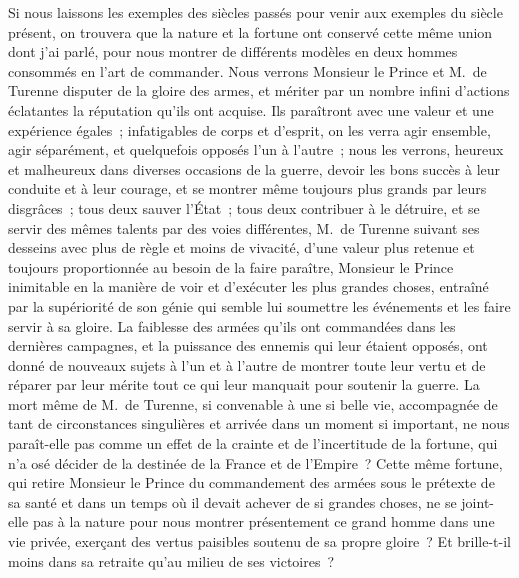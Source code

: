 \documentclass[french,twoside]{book} %
\begin{document}
Si nous laissons les exemples des siècles passés pour venir aux exemples du siècle présent, on trouvera que la nature et la fortune ont conservé cette même union dont j’ai parlé, pour nous montrer de différents modèles en deux hommes consommés en l’art de commander. Nous verrons Monsieur le Prince et M. de Turenne disputer de la gloire des armes, et mériter par un nombre infini d’actions éclatantes la réputation qu’ils ont acquise. Ils paraîtront avec une valeur et une expérience égales ; infatigables de corps et d’esprit, on les verra agir ensemble, agir séparément, et quelquefois opposés l’un à l’autre ; nous les verrons, heureux et malheureux dans diverses occasions de la guerre, devoir les bons succès à leur conduite et à leur courage, et se montrer même toujours plus grands par leurs disgrâces ; tous deux sauver l’État ; tous deux contribuer à le détruire, et se servir des mêmes talents par des voies différentes, M. de Turenne suivant ses desseins avec plus de règle et moins de vivacité, d’une valeur plus retenue et toujours proportionnée au besoin de la faire paraître, Monsieur le Prince inimitable en la manière de voir et d’exécuter les plus grandes choses, entraîné par la supériorité de son génie qui semble lui soumettre les événements et les faire servir à sa gloire. La faiblesse des armées qu’ils ont commandées dans les dernières campagnes, et la puissance des ennemis qui leur étaient opposés, ont donné de nouveaux sujets à l’un et à l’autre de montrer toute leur vertu et de réparer par leur mérite tout ce qui leur manquait pour soutenir la guerre. La mort même de M. de Turenne, si convenable à une si belle vie, accompagnée de tant de circonstances singulières et arrivée dans un moment si important, ne nous paraît-elle pas comme un effet de la crainte et de l’incertitude de la fortune, qui n’a osé décider de la destinée de la France et de l’Empire ? Cette même fortune, qui retire Monsieur le Prince du commandement des armées sous le prétexte de sa santé et dans un temps où il devait achever de si grandes choses, ne se joint-elle pas à la nature pour nous montrer présentement ce grand homme dans une vie privée, exerçant des vertus paisibles soutenu de sa propre gloire ? Et brille-t-il moins dans sa retraite qu’au milieu de ses victoires ?
\end{document}
